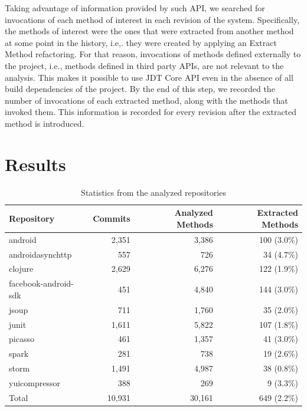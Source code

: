Taking advantage of information provided by such API, we searched for invocations of each method of interest in each revision of the system. Specifically, the methods of interest were the ones that were extracted from another method at some point in the history, i.e,. they were created by applying an Extract Method refactoring.
For that reason, invocations of methods defined externally to the project, i.e., methods defined in third party APIs, are not relevant to the analysis.
This makes it possible to use JDT Core API even in the absence of all build dependencies of the project.
By the end of this step, we recorded the number of invocations of each extracted method, along with the methods that invoked them. This information is recorded for every revision after the extracted method is introduced. 



\section{Results}
\label{sresultados}

\begin{table}[b]\centering
\renewcommand{\arraystretch}{1.3}
\caption{Statistics from the analyzed repositories}
\begin{tabular}{@{}lrrr@{}}\toprule
Repository & Commits & Analyzed Methods & Extracted Methods \\
\midrule
android & 2,351 & 3,386 & 100 (3.0\%) \\
android\-async\-http & 557 & 726 & 34 (4.7\%) \\
clojure & 2,629 & 6,276 & 122 (1.9\%) \\
facebook-android-sdk & 451 & 4,840 & 144 (3.0\%) \\
jsoup & 711 & 1,760 & 35 (2.0\%) \\
junit & 1,611 & 5,822 & 107 (1.8\%) \\
picasso & 461 & 1,357 & 41 (3.0\%) \\
spark & 281 & 738 & 19 (2.6\%) \\
storm & 1,491 & 4,987 & 38 (0.8\%) \\
yuicompressor & 388 & 269 & 9 (3.3\%) \\
\midrule
Total & 10,931 & 30,161 & 649 (2.2\%) \\
\bottomrule
\end{tabular}
\label{tcommits}
\end{table}

